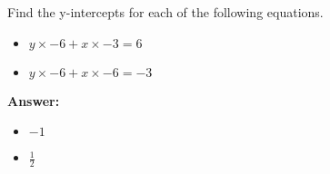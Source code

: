  Find the y-intercepts for each of the following equations. \begin{itemize}\item \( y \times -6 + x \times -3 = 6 \)\item \( y \times -6 + x \times -6 = -3 \)\end{itemize}

        \textbf{Answer:} \begin{itemize}\item \( -1 \)\item \( \frac{1}{2} \)\end{itemize}
